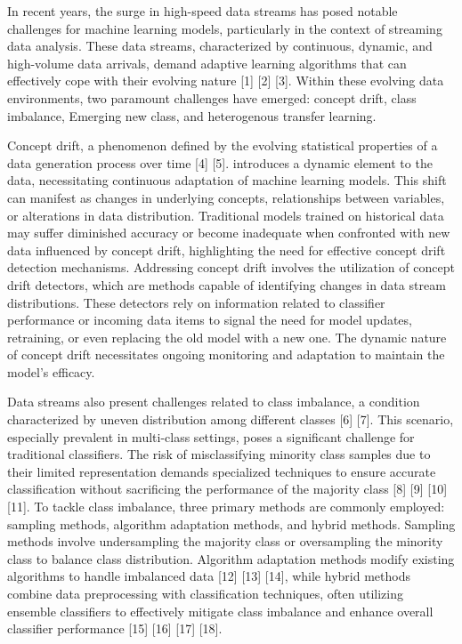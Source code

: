 In recent years, the surge in high-speed data streams has posed notable challenges for machine learning models, particularly in the context of streaming data analysis. These data streams, characterized by continuous, dynamic, and high-volume data arrivals, demand adaptive learning algorithms that can effectively cope with their evolving nature [1] [2] [3]. Within these evolving data environments, two paramount challenges have emerged: concept drift, class imbalance, Emerging new class, and heterogenous transfer learning.

Concept drift, a phenomenon defined by the evolving statistical properties of a data generation process over time [4] [5]. introduces a dynamic element to the data, necessitating continuous adaptation of machine learning models. This shift can manifest as changes in underlying concepts, relationships between variables, or alterations in data distribution. Traditional models trained on historical data may suffer diminished accuracy or become inadequate when confronted with new data influenced by concept drift, highlighting the need for effective concept drift detection mechanisms. Addressing concept drift involves the utilization of concept drift detectors, which are methods capable of identifying changes in data stream distributions. These detectors rely on information related to classifier performance or incoming data items to signal the need for model updates, retraining, or even replacing the old model with a new one. The dynamic nature of concept drift necessitates ongoing monitoring and adaptation to maintain the model's efficacy.

Data streams also present challenges related to class imbalance, a condition characterized by uneven distribution among different classes [6] [7]. This scenario, especially prevalent in multi-class settings, poses a significant challenge for traditional classifiers. The risk of misclassifying minority class samples due to their limited representation demands specialized techniques to ensure accurate classification without sacrificing the performance of the majority class [8] [9] [10] [11]. To tackle class imbalance, three primary methods are commonly employed: sampling methods, algorithm adaptation methods, and hybrid methods. Sampling methods involve undersampling the majority class or oversampling the minority class to balance class distribution. Algorithm adaptation methods modify existing algorithms to handle imbalanced data [12] [13] [14], while hybrid methods combine data preprocessing with classification techniques, often utilizing ensemble classifiers to effectively mitigate class imbalance and enhance overall classifier performance [15] [16] [17] [18].

